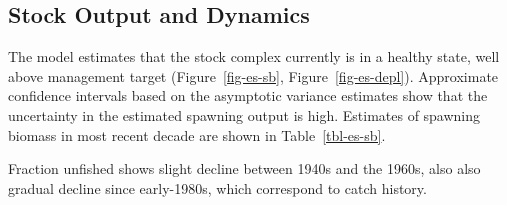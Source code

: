 \documentclass[
]{scrartcl}
\begin{document}
\subsection{Stock Output and Dynamics}\label{stock-output-and-dynamics}

The model estimates that the stock complex currently is in a healthy
state, well above management target (Figure~\ref{fig-es-sb},
Figure~\ref{fig-es-depl}). Approximate confidence intervals based on the
asymptotic variance estimates show that the uncertainty in the estimated
spawning output is high. Estimates of spawning biomass in most recent
decade are shown in Table~\ref{tbl-es-sb}.

Fraction unfished shows slight decline between 1940s and the 1960s, also
also gradual decline since early-1980s, which correspond to catch
history.

\begingroup
\fontsize{9.0pt}{10.8pt}\selectfont
\end{document}
